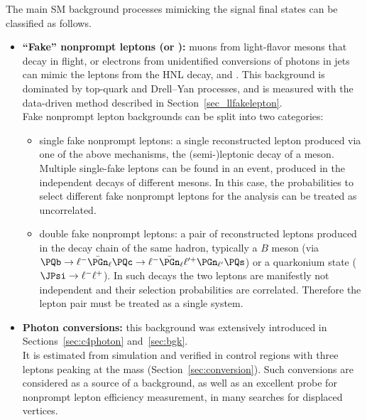 The main SM background processes mimicking the signal final states can be
classified as follows.
\begin{itemize}
\item \textbf{``Fake'' nonprompt leptons (\Pe or \PGm):}
  muons from light-flavor mesons that decay in flight, or electrons from
  unidentified conversions of photons in jets
  can mimic the \displ leptons from the HNL decay, \ltwo and
  \lthree.
  This background is dominated by top-quark and Drell--Yan processes,
  and is measured with the data-driven method described in
  Section~\ref{sec_llfakelepton}.\\
  Fake nonprompt lepton backgrounds can be split into two categories:
  \begin{itemize}
  \item single fake nonprompt leptons:
    a single reconstructed lepton produced via one of the above
    mechanisms, \eg the (semi-)leptonic decay of a meson.
    Multiple single-fake leptons can be found in an event,
    produced in the independent decays of different mesons.
    In this case, the probabilities to select different fake nonprompt
    leptons for the analysis can be treated as uncorrelated.
  \item double fake nonprompt leptons:
    a pair of reconstructed leptons produced in the decay chain of the
    same hadron, typically a $B$ meson (\eg via
    $\PQb\to\ell^-\bar{\PGn}_{\ell}\PQc\to\ell^-\bar{\PGn}_{\ell}\ell^{\prime+}\PGn_{\ell^{\prime}}\PQs$)
    or a quarkonium state (\eg $\JPsi\to\ell^-\ell^+$).
    In such decays the two leptons are manifestly not independent and
    their selection probabilities are correlated.
    Therefore the lepton pair must be treated as a single system.
  \end{itemize}
\item \textbf{Photon conversions:} this background was extensively
  introduced in Sections~\ref{sec:c4photon} and~\ref{sec:bgk}.\\
  It is estimated from simulation and verified in control regions with
  three leptons peaking at the \PZ mass (Section~\ref{sec:conversion}).
  Such conversions are considered as a
  source of a background, as well as an excellent probe for nonprompt
  lepton efficiency
 measurement, in many searches for displaced vertices.

\end{itemize}
 
